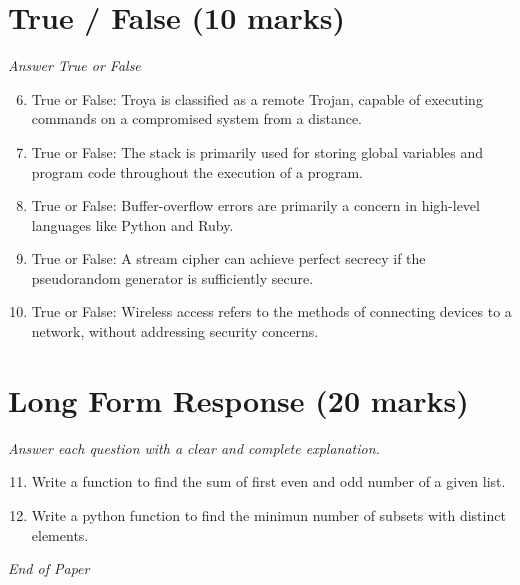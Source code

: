 \documentclass[12pt]{article}
\begin{document}
\section*{True / False (10 marks)}
\textit{Answer True or False}
\begin{enumerate}[label=\arabic*.]
\setcounter{enumi}{5}
\item True or False: Troya is classified as a remote Trojan, capable of executing commands on a compromised system from a distance.
\item True or False: The stack is primarily used for storing global variables and program code throughout the execution of a program.
\item True or False: Buffer-overflow errors are primarily a concern in high-level languages like Python and Ruby.
\item True or False: A stream cipher can achieve perfect secrecy if the pseudorandom generator is sufficiently secure.
\item True or False: Wireless access refers to the methods of connecting devices to a network, without addressing security concerns.
\end{enumerate}

\section*{Long Form Response (20 marks)}
\textit{Answer each question with a clear and complete explanation.}
\begin{enumerate}[label=\arabic*.]
\setcounter{enumi}{10}
\item Write a function to find the sum of first even and odd number of a given list.
\item Write a python function to find the minimun number of subsets with distinct elements.
\end{enumerate}

\vfill
\noindent\textit{End of Paper}
\end{document}

